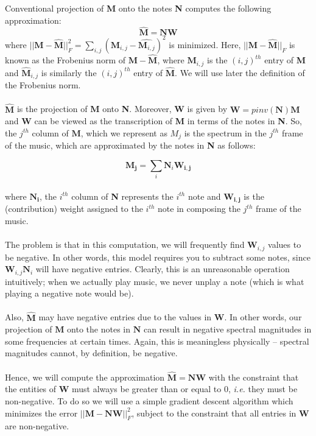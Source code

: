 Conventional projection of \textbf{M} onto the notes \textbf{N} computes the following approximation:
$$\hat{\mathbf{M}} =\mathbf{N}\mathbf{W} $$
where $||\mathbf{M}-\hat{\mathbf{M}}||_{F}^{2} =  \sum_{i,j}(\mathbf{M}_{i,j}-\hat{\mathbf{M}_{i,j}})^{2}$ is minimized. Here, $||\mathbf{M}-\hat{\mathbf{M}}||_{F}$ is known as the Frobenius norm of $\mathbf{M} - \hat{\mathbf{M}}$, where $\mathbf{M}_{i,j}$ is the $(i,j)^{th}$ entry of \textbf{M} and $\hat{\mathbf{M}}_{i,j}$ is similarly the $(i,j)^{th}$ entry of $\hat{\textbf{M}}$. We will use later the definition of the Frobenius norm.
\\
\\
$\hat{\textbf{M}}$ is the projection of \textbf{M} onto \textbf{N}. Moreover, \textbf{W} is given by $\mathbf{W} = pinv(\mathbf{N})\mathbf{M}$ and \textbf{W} can be viewed as the transcription of \textbf{M} in terms of the notes in \textbf{N}. So, the $j^{th}$ column of $\mathbf{M}$, which we represent as $M_{j}$ is the spectrum in the $j^{th}$ frame of the music, which are approximated by the notes in \textbf{N} as follows:

$$\mathbf{M_{j}} = \sum_{i}\mathbf{N}_i\mathbf{W_{i,j}}$$
\\
where $\mathbf{N_i}$, the $i^{th}$ column of \textbf{N} represents the $i^{th}$ note and $\mathbf{W_{i,j}}$ is the (contribution) weight assigned to the $i^{th}$ note in composing the $j^{th}$ frame of the music.
\\
\\
The problem is that in this computation, we will frequently find $\mathbf{W}_{i,j}$ values to be negative. In other words, this model requires you to subtract some notes, since $\mathbf{W}_{i,j}\mathbf{N}_{i}$ will have negative entries.  Clearly, this is an unreasonable operation intuitively; when we actually play music, we never unplay a note (which is what playing a negative note would be).
\\
\\
Also, $\mathbf{\hat{M}}$ may have negative entries due to the values in \textbf{W}. In other words, our projection of $\mathbf{M}$ onto the notes in $\mathbf{N}$ can result in negative spectral magnitudes in some frequencies at certain times. Again, this is meaningless physically -- spectral magnitudes cannot, by definition, be negative.
\\
\\
Hence, we will compute the approximation $\mathbf{\hat{M}=NW}$ with the constraint that the entities of $\mathbf{W}$ must always be greater than or equal to 0, \textit{i.e.} they must be non-negative. To do so we will use a simple gradient descent algorithm which minimizes the error $|| \mathbf{M - NW}|| ^2_F$, subject to the constraint that all entries in $\mathbf{W}$ are non-negative.


